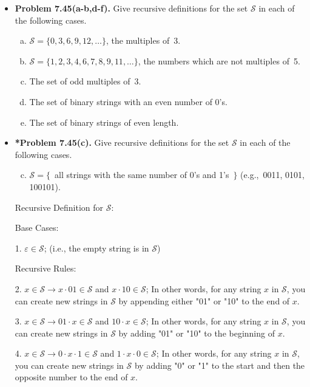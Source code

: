 \documentclass[11pt]{article}
\begin{document}
\begin{itemize}
\item \textbf{Problem 7.45(a-b,d-f).}
Give recursive definitions for the set $\mathcal{S}$ in each of the following cases.
\begin{enumerate}[(a)]
\item $\mathcal{S}=\{0,3,6,9,12,\dots\}$, the multiples of~3.
\item $\mathcal{S}=\{1,2,3,4,6,7,8,9,11,\dots\}$, the numbers which are not multiples of~5.
\setcounter{enumi}{3}
\item The set of odd multiples of~3.
\item The set of binary strings with an even number of 0's.
\item The set of binary strings of even length.
\end{enumerate}

\vspace{0.1in}

\item \textbf{*Problem 7.45(c).}
Give recursive definitions for the set $\mathcal{S}$ in each of the following cases.
\begin{enumerate}[(a)]
\setcounter{enumi}{2}
\item $\mathcal{S}=\{$\ all strings with the same number of 0's and 1's\ $\}$
  (e.g.,~0011, 0101, 100101).
\end{enumerate}

\begin{center}
  Recursive Definition for $\mathcal{S}$:
\end{center}

Base Cases:

1. $\varepsilon \in \mathcal{S}$; (i.e., the empty string is in $\mathcal{S}$)

Recursive Rules:

2. $x \in \mathcal{S} \xrightarrow{} x \cdot 01 \in \mathcal{S}$ and $x \cdot 10 \in \mathcal{S}$; In other words, for any string $x$ in $\mathcal{S}$, you can create new strings in $\mathcal{S}$ by appending either "01" or "10" to the end of $x$.

3. $x \in \mathcal{S} \xrightarrow{} 01 \cdot x \in \mathcal{S}$ and $10 \cdot x \in \mathcal{S}$; In other words, for any string $x$ in $\mathcal{S}$, you can create new strings in $\mathcal{S}$ by adding "01" or "10" to the beginning of $x$.

4. $x \in \mathcal{S} \xrightarrow{} 0 \cdot x \cdot 1 \in \mathcal{S}$ and $1 \cdot x \cdot 0 \in \mathcal{S}$; In other words, for any string $x$ in $\mathcal{S}$, you can create new strings in $\mathcal{S}$ by adding "0" or "1" to the start and then the opposite number to the end of $x$.


\end{itemize}
\end{document}
